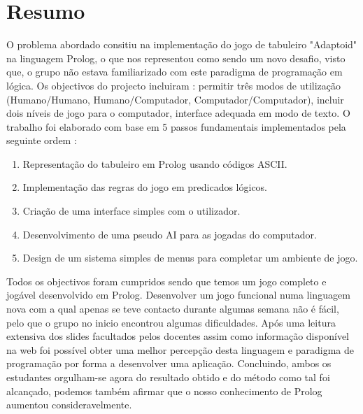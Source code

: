 \documentclass[a4paper]{article}
\begin{document}

\newpage

\section*{Resumo}
O problema abordado consitiu na implementação do jogo de tabuleiro "Adaptoid" na linguagem Prolog, o que nos representou como sendo um novo desafio, visto que, o grupo não estava familiarizado com este paradigma de programação em lógica. Os objectivos do projecto incluiram : permitir três modos de utilização (Humano/Humano, Humano/Computador, Computador/Computador), incluir dois níveis de jogo para o computador, interface adequada em modo de texto. O trabalho foi elaborado com base em 5 passos fundamentais implementados pela seguinte ordem :
\begin{enumerate}
    \item Representação do tabuleiro em Prolog usando códigos ASCII.
    \item Implementação das regras do jogo em predicados lógicos.
    \item Criação de uma interface simples com o utilizador.
    \item Desenvolvimento de uma pseudo AI para as jogadas do computador.
    \item Design de um sistema simples de menus para completar um ambiente de jogo.
\end{enumerate}
Todos os objectivos foram cumpridos sendo que temos um jogo completo e jogável desenvolvido em Prolog. Desenvolver um jogo funcional numa linguagem nova com a qual apenas se teve contacto durante algumas semana não é fácil, pelo que o grupo no inicio encontrou algumas dificuldades. Após uma leitura extensiva dos slides facultados pelos docentes assim como informação disponível na web foi possível obter uma melhor percepção desta linguagem e paradigma de programação por forma a desenvolver uma aplicação.
Concluindo, ambos os estudantes orgulham-se agora do resultado obtido e do método como tal foi alcançado, podemos também afirmar que o nosso conhecimento de Prolog aumentou consideravelmente.
\newpage

\tableofcontents

\end{document}
